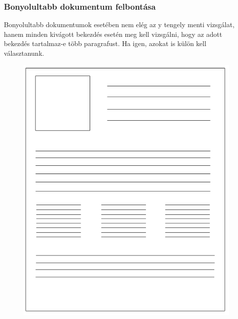 \documentclass{beamer}
\begin{document}
\begin{frame}[fragile]
\frametitle{Bonyolultabb dokumentum felbontása}

Bonyolultabb dokumentumok esetében nem elég az y tengely menti vizsgálat, hanem minden kivágott bekezdés esetén meg kell vizsgálni, hogy az adott bekezdés tartalmaz-e több paragrafust.
Ha igen, azokat is külön kell választanunk.

\begin{figure}[!tbp]
  \centering
  \begin{minipage}[b]{0.3\textwidth}
    \includegraphics[width=\textwidth]{images/page_complicated.png}
  \end{minipage}
  \hfill
  \begin{minipage}[b]{0.3\textwidth}

\end{minipage}
\end{figure}
\end{frame}
\end{document}

